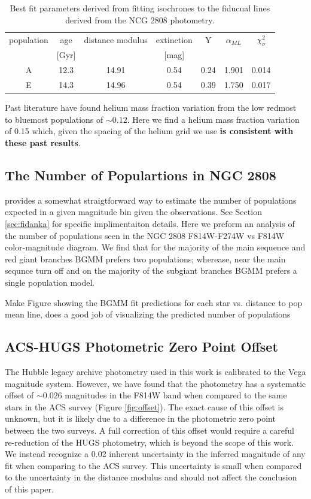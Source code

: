 \begin{table}
  \centering
  \begin{tabular}{c | c c c c c c}
    \hline
    population & age & distance modulus & extinction & Y & $\alpha_{ML}$ & $\chi^{2}_{\nu}$\\
    & [Gyr] & & [mag] & & &\\
    \hline
    \hline
    A & 12.3 & 14.91 & 0.54 & 0.24 & 1.901 & 0.014\\
    E & 14.3 & 14.96 & 0.54 & 0.39 & 1.750 & 0.017 \\
    \hline
  \end{tabular}
  \label{tab:BestFitResults}
  \caption{Best fit parameters derived from fitting isochrones to the fiducual lines derived from the NCG 2808 photometry.}
\end{table}


Past literature \citep[e.g. ][]{Milone2015, Milone2018} have found helium mass fraction variation from the low redmost to bluemost populations of $\sim 0.12$. Here we find a helium mass fraction variation of 0.15 which, given the spacing of the helium grid we use \textbf{is consistent with these past results}.

\subsection{The Number of Populartions in NGC 2808}
\fidanka provides a somewhat straigtforward way to estimate the number of populations expected in a given magnitude bin given the observations. See Section \ref{sec:fidanka} for specific implimentaiton details. Here we preform an analysis of the number of populations seen in the NGC 2808 F814W-F274W vs F814W color-magnitude diagram. We find that for the majority of the main sequence and red giant branches BGMM prefers two populations; wherease, near the main sequnce turn off and on the majority of the subgiant branches BGMM prefers a single population model.

{\color{red} Make Figure showing the BGMM fit predictions for each star vs. distance to pop mean line, does a good job of visualizing the predicted number of populations}


\subsection{ACS-HUGS Photometric Zero Point Offset}
The Hubble legacy archive photometry used in this work is calibrated to the
Vega magnitude system. However, we have found that the photometry has a
systematic offset of $\sim0.026$ magnitudes in the F814W band when
compared to the same stars in the ACS survey (Figure \ref{fig:offset}). The
exact cause of this offset is unknown, but it is likely due to a difference in
the photometric zero point between the two surveys. A full correction of this
offset would require a careful re-reduction of the HUGS photometry, which is
beyond the scope of this work. We instead recognize a 0.02 inherent uncertainty
in the inferred magnitude of any fit when comparing to the ACS survey. This
uncertainty is small when compared to the uncertainty in the
distance modulus and should not affect the conclusion of this
paper. 

